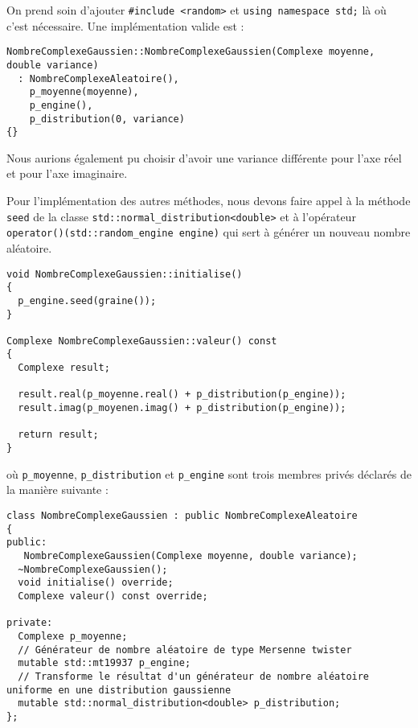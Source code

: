 \documentclass{book}
\newcommand{\inline}[1]{\texttt{#1}}
\begin{document}
\begin{correction}
On prend soin d'ajouter \texttt{#include <random>} et \inline{using namespace std;} là où c'est nécessaire. Une implémentation valide est :
\begin{verbatim}
NombreComplexeGaussien::NombreComplexeGaussien(Complexe moyenne, double variance)
  : NombreComplexeAleatoire(), 
    p_moyenne(moyenne),
    p_engine(), 
    p_distribution(0, variance) 
{}
\end{verbatim}
Nous aurions également pu choisir d'avoir une variance différente pour l'axe réel et pour l'axe imaginaire.

Pour l'implémentation des autres méthodes, nous devons faire appel à la méthode \inline{seed} de la classe \texttt{std::normal_distribution<double>} et à l'opérateur \inline{operator()(std::random_engine engine)} qui sert à générer un nouveau nombre aléatoire.
\begin{verbatim}
void NombreComplexeGaussien::initialise()
{
  p_engine.seed(graine());
}

Complexe NombreComplexeGaussien::valeur() const
{
  Complexe result;

  result.real(p_moyenne.real() + p_distribution(p_engine));
  result.imag(p_moyenen.imag() + p_distribution(p_engine));

  return result;
}
\end{verbatim}
où \inline{p_moyenne}, \inline{p_distribution} et \inline{p_engine} sont trois membres privés déclarés de la manière suivante :
\begin{verbatim}
class NombreComplexeGaussien : public NombreComplexeAleatoire
{
public:
   NombreComplexeGaussien(Complexe moyenne, double variance);
  ~NombreComplexeGaussien();
  void initialise() override;
  Complexe valeur() const override;
  
private:
  Complexe p_moyenne;
  // Générateur de nombre aléatoire de type Mersenne twister
  mutable std::mt19937 p_engine; 
  // Transforme le résultat d'un générateur de nombre aléatoire uniforme en une distribution gaussienne
  mutable std::normal_distribution<double> p_distribution; 
};
\end{verbatim}
\end{correction}
\end{document}
